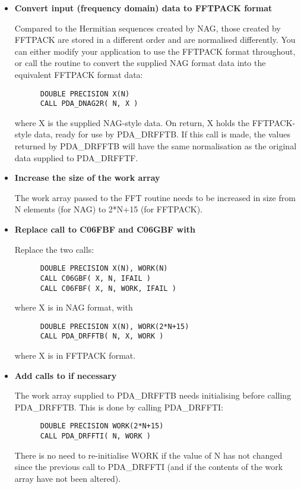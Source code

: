 \begin{itemize}

\item{\bf Convert input (frequency domain) data to FFTPACK format}

   Compared to the Hermitian sequences created by NAG, those created by
   FFTPACK are stored in a different order and are normalised
   differently. You can either modify your application to use the
   FFTPACK format throughout, or call the
   routine to convert the supplied NAG format data into the
   equivalent FFTPACK format data:

\begin{verbatim}
      DOUBLE PRECISION X(N)
      CALL PDA_DNAG2R( N, X )
\end{verbatim}

   where X is the supplied NAG-style data. On return, X holds the
   FFTPACK-style data, ready for use by PDA\_DRFFTB. If this call is made,
   the values returned by PDA\_DRFFTB will have the same normalisation as the
   original data supplied to PDA\_DRFFTF.

\item{\bf Increase the size of the work array}

   The work array passed to the FFT routine needs to be increased in
   size from N elements (for NAG) to 2*N+15 (for FFTPACK).

\item{\bf Replace call to C06FBF and C06GBF with
}

   Replace the two calls:

\begin{verbatim}
      DOUBLE PRECISION X(N), WORK(N)
      CALL C06GBF( X, N, IFAIL )
      CALL C06FBF( X, N, WORK, IFAIL )
\end{verbatim}

   where X is in NAG format, with

\begin{verbatim}
      DOUBLE PRECISION X(N), WORK(2*N+15)
      CALL PDA_DRFFTB( N, X, WORK )
\end{verbatim}

   where X is in FFTPACK format.

\item{\bf Add calls to
   if necessary}

   The work array supplied to PDA\_DRFFTB needs initialising before calling
   PDA\_DRFFTB. This is done by calling PDA\_DRFFTI:

\begin{verbatim}
      DOUBLE PRECISION WORK(2*N+15)
      CALL PDA_DRFFTI( N, WORK )
\end{verbatim}

   There is no need to re-initialise WORK if the value of N has not
   changed since the previous call to PDA\_DRFFTI (and if the contents of the
   work array have not been altered).

\end{itemize}

